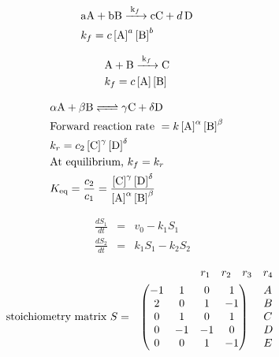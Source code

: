 \documentclass{article}
\begin{document}
\begin{eqnarray*}
&\ce{a\textrm{A} + b\textrm{B} ->[k_f]  c\textrm{C} + d \textrm{D} }&\\
&k_f = c \left[ \textrm{A} \right]^a \left[ \textrm{B} \right]^b &
\end{eqnarray*}

\begin{eqnarray*}
&\ce{\textrm{A} + \textrm{B} ->[k_f]  \textrm{C}}&\\
&k_f = c \left[ \textrm{A} \right] \left[ \textrm{B} \right] &
\end{eqnarray*}

\begin{eqnarray*}
&\ce{\alpha \textrm{A} +  \beta \textrm{B} <=> \gamma \textrm{C} + \delta \textrm{D}}&\\
&\textrm{Forward reaction rate } = k \left[ \textrm{A} \right]^{\alpha} \left[ \textrm{B} \right]^{\beta} &\\
&k_r = c_2 \left[ \textrm{C} \right]^{\gamma} \left[ \textrm{D} \right]^{\delta} & \\
&\textrm{At equilibrium, } k_f = k_r& \\
& K_{\textrm{eq}} = \frac{c_2}{c_1} = \frac{\left[ \textrm{C} \right]^{\gamma} \left[ \textrm{D} \right]^{\delta}}{\left[ \textrm{A} \right]^{\alpha} \left[ \textrm{B} \right]^{\beta}}&
\end{eqnarray*}

\begin{eqnarray*}
\frac{dS_1}{dt} & = & v_0 - k_1 S_1\\
\frac{dS_2}{dt} & = & k_1 S_1 - k_2 S_2
\end{eqnarray*}

\begin{eqnarray*}
&  & \hspace{0.25cm}
\begin{array}{ccccc}
       r_1 & r_2 & r_3 & r_4
     \end{array}\\
\textrm{stoichiometry matrix } S & = & \begin{pmatrix} -1 & 1 & 0 & 1\\
2 & 0 & 1 & -1\\
0 & 1 & 0 & 1\\
0 & -1 & -1 & 0\\
0 & 0 & 1 & -1
\end{pmatrix} 
\hspace{0.25 cm}
\begin{array}{l}
       A\\
      B\\
      C\\
      D\\
      E
     \end{array}
\end{eqnarray*}
\end{document}
